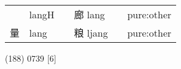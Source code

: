 \documentclass[14pt,a4paper]{scrartcl}
\begin{document}
\begin{longtable}[c]{@{}llllll@{}}
\begin{minipage}[t]{0.14\columnwidth}
\strut\end{minipage} &
\begin{minipage}[t]{0.14\columnwidth}\raggedright\strut
langH
\strut\end{minipage} &
\begin{minipage}[t]{0.14\columnwidth}\raggedright\strut
\strut\end{minipage} &
\begin{minipage}[t]{0.14\columnwidth}\raggedright\strut
廊 lang
\strut\end{minipage} &
\begin{minipage}[t]{0.14\columnwidth}\raggedright\strut
\strut\end{minipage} &
\begin{minipage}[t]{0.14\columnwidth}\raggedright\strut
pure:other
\strut\end{minipage}\tabularnewline
\begin{minipage}[t]{0.14\columnwidth}\raggedright\strut
量
\strut\end{minipage} &
\begin{minipage}[t]{0.14\columnwidth}\raggedright\strut
lang
\strut\end{minipage} &
\begin{minipage}[t]{0.14\columnwidth}\raggedright\strut
\strut\end{minipage} &
\begin{minipage}[t]{0.14\columnwidth}\raggedright\strut
粮 ljang
\strut\end{minipage} &
\begin{minipage}[t]{0.14\columnwidth}\raggedright\strut
\strut\end{minipage} &
\begin{minipage}[t]{0.14\columnwidth}\raggedright\strut
pure:other
\strut\end{minipage}\tabularnewline
\bottomrule
\end{longtable}

(188) 0739 {[}6{]}
\end{document}
